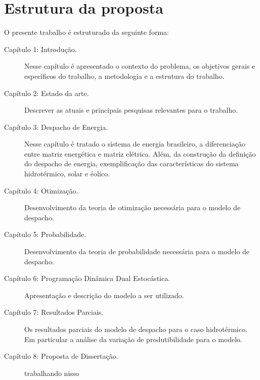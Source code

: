 \section{Estrutura da proposta}
O presente trabalho \'e estruturado da seguinte forma:
\begin{description}
	\item[Cap\'itulo 1: Introdu\c c\~ao.]
		Nesse cap\'itulo \'e apresentado o contexto do problema, os objetivos gerais e espec\'ificos do trabalho, a
		metodologia e a estrutura do trabalho.
	\item[Cap\'itulo 2: Estado da arte.]
		Descrever as atuais e principais pesquisas relevantes para o trabalho.
	\item[Cap\'itulo 3: Despacho de Energia.]
		Nesse cap\'itulo \'e tratado o sistema de energia brasileiro, a diferencia\c c\~ao entre matriz energ\'etica e
		matriz el\'etrica. Al\'em, da constru\c c\~ao  da defini\c c\~ao do despacho de energia, exemplifica\c c\~ao das
		caracter\'isticas do sistema hidrot\'ermico, solar e \'eolico.
	\item[Cap\'itulo 4: Otimiza\c c\~ao.]
		Desenvolvimento da teoria de otimiza\c c\~ao necess\'aria para o modelo de despacho.
	\item[Cap\'itulo 5: Probabilidade.]
		Desenvolvimento da teoria de probabilidade necess\'aria para o modelo de despacho.
	\item[Cap\'itulo 6: Programa\c c\~ao Din\^amica Dual Estoc\'astica.]
		Apresenta\c c\~ao e descri\c c\~ao do modelo a ser utilizado.
	\item[Cap\'itulo 7: Resultados Parciais.]
		Os resultados parciais do modelo de despacho para o caso hidrot\'ermico. Em particular a an\'alise da varia\c
		c\~ao de produtibilidade para o modelo.
	\item[Cap\'itulo 8: Proposta de Disserta\c c\~ao.]
		trabalhando nisso
\end{description}

